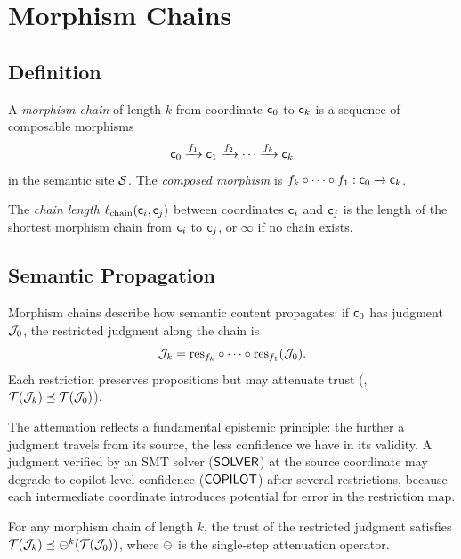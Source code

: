 \documentclass[11pt]{article}
\newcommand{\ChainLen}{\ell_{\mathrm{chain}}}
\begin{document}
\section{Morphism Chains}\label{sec:morphism-chains}

\subsection{Definition}

\begin{definition}\label{def:morph-chain}
A \emph{morphism chain} of length $k$ from coordinate $\mathsf{c}_0$ to
$\mathsf{c}_k$ is a sequence of composable morphisms
\[
  \mathsf{c}_0 \xrightarrow{f_1} \mathsf{c}_1 \xrightarrow{f_2}
  \cdots \xrightarrow{f_k} \mathsf{c}_k
\]
in the semantic site $\mathcal{S}$.  The \emph{composed morphism} is
$f_k \circ \cdots \circ f_1 : \mathsf{c}_0 \to \mathsf{c}_k$.
\end{definition}

\begin{definition}\label{def:chain-length}
The \emph{chain length} $\ChainLen(\coord_i, \coord_j)$ between coordinates
$\mathsf{c}_i$ and $\mathsf{c}_j$ is the length of the shortest morphism chain
from $\mathsf{c}_i$ to $\mathsf{c}_j$, or $\infty$ if no chain exists.
\end{definition}

\subsection{Semantic Propagation}
Morphism chains describe how semantic content propagates: if $\mathsf{c}_0$ has
judgment $\mathcal{J}_0$, the restricted judgment along the chain is
\[
  \mathcal{J}_k = \mathrm{res}_{f_k} \circ \cdots \circ \mathrm{res}_{f_1}(\mathcal{J}_0).
\]
Each restriction preserves propositions but may attenuate trust
(\ie, $\mathcal{T}(\mathcal{J}_k) \preceq \mathcal{T}(\mathcal{J}_0)$).

The attenuation reflects a fundamental epistemic principle: the further a
judgment travels from its source, the less confidence we have in its
validity.  A judgment verified by an SMT solver ($\mathsf{SOLVER}$) at the source
coordinate may degrade to copilot-level confidence ($\mathsf{COPILOT}$) after
several restrictions, because each intermediate coordinate introduces
potential for error in the restriction map.

\begin{proposition}\label{prop:trust-atten}
For any morphism chain of length $k$, the trust of the restricted judgment
satisfies $\mathcal{T}(\mathcal{J}_k) \preceq \ominus^k(\mathcal{T}(\mathcal{J}_0))$, where $\ominus$
is the single-step attenuation operator.
\end{proposition}
\end{document}
